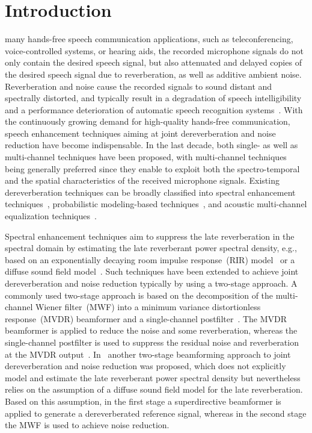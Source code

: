 \documentclass[draftcls,onecolumn,11pt]{IEEEtran}
\begin{document}
\section{Introduction}
 many hands-free speech communication applications, such as teleconferencing, voice-controlled systems, or hearing aids, the recorded microphone signals do not only contain the desired speech signal, but also attenuated and delayed copies of the desired speech signal due to reverberation, as well as additive ambient noise.
Reverberation and noise cause the recorded signals to sound distant and spectrally distorted, and typically result in a degradation of speech intelligibility and a performance deterioration of automatic speech recognition systems~\cite{Omologo_1998,Beutelmann_2006}.
With the continuously growing demand for high-quality hands-free communication, speech enhancement techniques aiming at joint dereverberation and noise reduction have become indispensable.
In the last decade, both single- as well as multi-channel techniques have been proposed, with multi-channel techniques being generally preferred since they enable to exploit both the spectro-temporal and the spatial characteristics of the received microphone signals.
Existing dereverberation techniques can be broadly classified into spectral enhancement techniques~\cite{Lebart_ACUSTICA_2001,Habets_ICASSP_2005,Habets2009a,Kuklasinski_EUSIPCO_2014}, probabilistic modeling-based techniques~\cite{Nakatani_ITASLP_2010,Jukic_ICASSP_2014,Schwartz_ITASLP_2015}, and acoustic multi-channel equalization techniques~\cite{Miyoshi_ITASS_1988, Kallinger_ICASSP_2006,Jungmann_ITASLP_2012, Kodrasi_ITASLP_2013, Lim_ITASLP_2014, Rashobh_ITASLP_2014}.

Spectral enhancement techniques aim to suppress the late reverberation in the spectral domain by estimating the late reverberant power spectral density, e.g., based on an exponentially decaying room impulse response~(RIR) model~\cite{Lebart_ACUSTICA_2001,Habets_ICASSP_2005,Habets2009a} or a diffuse sound field model~\cite{Kuklasinski_EUSIPCO_2014}.
Such techniques have been extended to achieve joint dereverberation and noise reduction typically by using a two-stage approach.
A commonly used two-stage approach is based on the decomposition of the multi-channel Wiener filter~(MWF) into a minimum variance distortionless response~(MVDR) beamformer and a single-channel postfilter~\cite{Simmer_book_2001}. 
The MVDR beamformer is applied to reduce the noise and some reverberation, whereas the single-channel postfilter is used to suppress the residual noise and reverberation at the MVDR output~\cite{Braun_EUSIPCO_2013,Cauchi_Reverb_2014}. 
In~\cite{Habets_ITASLP_2013} another two-stage beamforming approach to joint dereverberation and noise reduction was proposed, which does not explicitly model and estimate the late reverberant power spectral density but nevertheless relies on the assumption of a diffuse sound field model for the late reverberation. 
Based on this assumption, in the first stage a superdirective beamformer is applied to generate a dereverberated reference signal, whereas in the second stage the MWF is used to achieve noise reduction.
\end{document}
